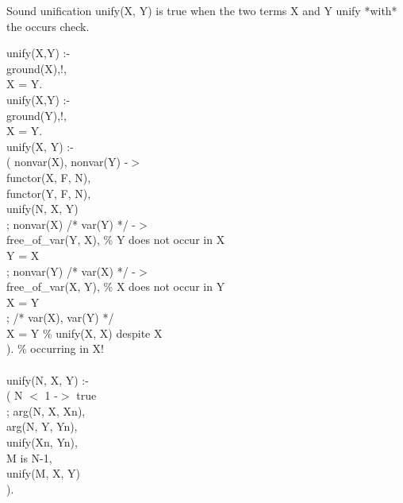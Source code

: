 \documentclass[11pt]{report}
\begin{document}
\begin{itemize}
 Sound unification
   unify(X, Y)
   is true when the two terms X and Y unify *with* the occurs check.
\begin{sf}\begin{tabbing}
unify(X,Y) :-\\[-0.15ex]
\hspace{2em}ground(X),!,\\[-0.15ex]
\hspace{2em}X = Y.\\[-0.15ex]
unify(X,Y) :-\\[-0.15ex]
\hspace{2em}ground(Y),!,\\[-0.15ex]
\hspace{2em}X = Y.\\[-0.15ex]
unify(X, Y) :-\\[-0.15ex]
\hspace{2em}(	nonvar(X), nonvar(Y) -$>$\\[-0.15ex]
	functor(X, F, N),\\[-0.15ex]
	functor(Y, F, N),\\[-0.15ex]
	unify(N, X, Y)\\[-0.15ex]
\hspace{2em};   nonvar(X) /* var(Y) */ -$>$\\[-0.15ex]
	free\_\hspace{0.1em}of\_\hspace{0.1em}var(Y, X),		\% Y does not occur in X\\[-0.15ex]
	Y = X\\[-0.15ex]
\hspace{2em};   nonvar(Y) /* var(X) */ -$>$\\[-0.15ex]
	free\_\hspace{0.1em}of\_\hspace{0.1em}var(X, Y),		\% X does not occur in Y\\[-0.15ex]
	X = Y\\[-0.15ex]
\hspace{2em};	/* var(X), var(Y) */\\[-0.15ex]
	X = Y				\% unify(X, X) despite X\\[-0.15ex]
\hspace{2em}).					\% occurring in X!\\[-0.7ex]
\\[-0.15ex]
unify(N, X, Y) :-\\[-0.15ex]
\hspace{2em}(	N $<$ 1 -$>$ true\\[-0.15ex]
\hspace{2em};	arg(N, X, Xn),\\[-0.15ex]
	arg(N, Y, Yn),\\[-0.15ex]
	unify(Xn, Yn),\\[-0.15ex]
	M is N-1,\\[-0.15ex]
	unify(M, X, Y)\\[-0.15ex]
\hspace{2em}).
\end{tabbing}\end{sf}


\end{itemize}
\end{document}
